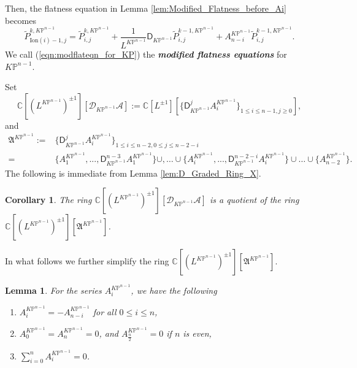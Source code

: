 \documentclass[12pt]{amsart}
\newtheorem{lem}[prop]{Lemma}
\newtheorem{cor}[prop]{Corollary}
\numberwithin{equation}{section}
\newcommand{\KP}{K\mathbb{P}}
\begin{document}
Then, the flatness equation in Lemma \ref{lem:Modified_Flatness_before_Ai} becomes
\begin{equation}\label{eqn:modflateqn_for_KP}
\widetilde{P}_{\mathrm{Ion}(i)-1,j}^{k,\KP^{n-1}}=\widetilde{P}_{i,j}^{k,\KP^{n-1}}+\frac{1}{L^{\KP^{n-1}}}\mathsf{D}_{\KP^{n-1}}\widetilde{P}_{i,j}^{k-1,\KP^{n-1}}+A^{\KP^{n-1}}_{n-i}\widetilde{P}_{i,j}^{k-1,\KP^{n-1}}.
\end{equation}
We call (\ref{eqn:modflateqn_for_KP}) the \textbf{\textit{modified flatness equations}} for $\KP^{n-1}$.

Set 
\begin{equation*}
\mathbb{C}[(L^{\KP^{n-1}})^{\pm 1}][\mathcal{D}_{\KP^{n-1}}\mathcal{A}]:=\mathbb{C}[L^{\pm 1}][\{\mathsf{D}_{\KP^{n-1}}^jA^{\KP^{n-1}}_i\}_{1\leq i\leq n-1, j\geq 0}],
\end{equation*}
and
\begin{align*}
\mathfrak{A}^{\KP^{n-1}}
:=&\{\mathsf{D}_{\KP^{n-1}}^jA^{\KP^{n-1}}_i\}_{1\leq i\leq n-2, 0\leq j\leq n-2-i}\\
=&\{A^{\KP^{n-1}}_1,...,\mathsf{D}_{\KP^{n-1}}^{n-3}A^{\KP^{n-1}}_1\}\cup,\ldots\cup\{A^{\KP^{n-1}}_i,...,\mathsf{D}_{\KP^{n-1}}^{n-2-i}A^{\KP^{n-1}}_i\}\cup\ldots\cup\{A^{\KP^{n-1}}_{n-2}\}.
\end{align*}
The following is immediate from Lemma \ref{lem:D_Graded_Ring_X}.
\begin{cor}\label{cor:DGradedRingA}The ring
$\mathbb{C}[(L^{\KP^{n-1}})^{\pm1}][\mathcal{D}_{\KP^{n-1}}\mathcal{A}]$ is a quotient of the ring $\mathbb{C}[(L^{\KP^{n-1}})^{\pm1}][\mathfrak{A}^{\KP^{n-1}}]$.
\end{cor}

In what follows we further simplify the ring $\mathbb{C}[(L^{\KP^{n-1}})^{\pm1}][\mathfrak{A}^{\KP^{n-1}}]$.

\begin{lem}\label{lem:Properties_of_Ai_s}
For the series $A^{\KP^{n-1}}_i$, we have the following
\begin{enumerate}
    \item $A^{\KP^{n-1}}_i=-A^{\KP^{n-1}}_{n-i}$ for all $0\leq{i}\leq{n}$,
    \item $A^{\KP^{n-1}}_0=A^{\KP^{n-1}}_n=0$, and $A^{\KP^{n-1}}_{\frac{n}{2}}=0$ if $n$ is even,
    \item $\sum_{i=0}^{n}A^{\KP^{n-1}}_i=0$.
\end{enumerate}
\end{lem}
\end{document}
